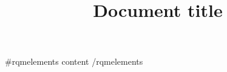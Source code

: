 \documentclass[a4paper,11pt]{article}
\title{Document title}
\begin{document}
	\setcounter{tocdepth}{3}
	\renewcommand\contentsname{Contents}
	\tableofcontents
	
	\bigskip
	
	\setcounter{tocdepth}{1}
	\renewcommand\contentsname{List of Figures}
	\begingroup
	\let\clearpage\relax
	\listoffigures
	\endgroup
	
	\bigskip

	\setcounter{tocdepth}{1}
	\renewcommand\contentsname{List of Tables}
	\begingroup
	\let\clearpage\relax
	\listoftables
	\endgroup

    \newpage
    
    \let\stdsection\section
    \renewcommand\section{\newpage\stdsection}

{{#rqmelements}}
{{{content}}}
{{/rqmelements}}
	
\end{document}
